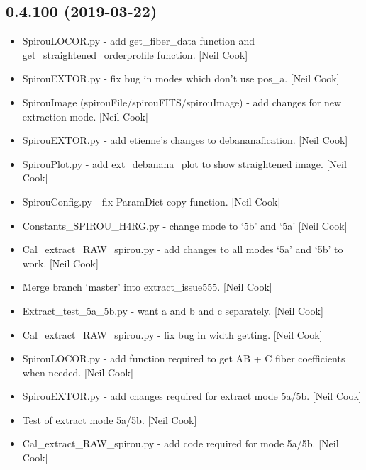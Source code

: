 \documentclass[a4paper,10pt,english]{report}
\begin{document}
\subsection{0.4.100 (2019-03-22)}
\label{\detokenize{misc/changelog:id158}}\begin{itemize}
\item {} 
SpirouLOCOR.py - add get\_fiber\_data function and
get\_straightened\_orderprofile function. {[}Neil Cook{]}

\item {} 
SpirouEXTOR.py - fix bug in modes which don’t use pos\_a. {[}Neil Cook{]}

\item {} 
SpirouImage (spirouFile/spirouFITS/spirouImage) - add changes for new
extraction mode. {[}Neil Cook{]}

\item {} 
SpirouEXTOR.py - add etienne’s changes to debananafication. {[}Neil
Cook{]}

\item {} 
SpirouPlot.py - add ext\_debanana\_plot to show straightened image.
{[}Neil Cook{]}

\item {} 
SpirouConfig.py - fix ParamDict copy function. {[}Neil Cook{]}

\item {} 
Constants\_SPIROU\_H4RG.py - change mode to ‘5b’ and ‘5a’ {[}Neil Cook{]}

\item {} 
Cal\_extract\_RAW\_spirou.py - add changes to all modes ‘5a’ and ‘5b’ to
work. {[}Neil Cook{]}

\item {} 
Merge branch ‘master’ into extract\_issue555. {[}Neil Cook{]}

\item {} 
Extract\_test\_5a\_5b.py - want a and b and c separately. {[}Neil Cook{]}

\item {} 
Cal\_extract\_RAW\_spirou.py - fix bug in width getting. {[}Neil Cook{]}

\item {} 
SpirouLOCOR.py - add function required to get AB + C fiber
coefficients when needed. {[}Neil Cook{]}

\item {} 
SpirouEXTOR.py - add changes required for extract mode 5a/5b. {[}Neil
Cook{]}

\item {} 
Test of extract mode 5a/5b. {[}Neil Cook{]}

\item {} 
Cal\_extract\_RAW\_spirou.py - add code required for mode 5a/5b. {[}Neil
Cook{]}

\end{itemize}
\end{document}
